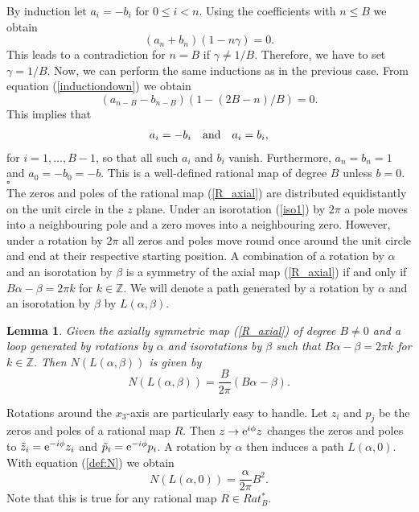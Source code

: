\documentclass[a4paper,12pt]{article}
\newtheorem {lemma}[theorem]{Lemma}
\begin{document}
By induction let $a_i = -b_i$ for $0 \leq i < n$. Using the coefficients 
with $n \leq B$ we obtain
%
\begin{equation}
(a_n + b_n)(1 - n \gamma) = 0.
\end{equation}
%
This leads to a contradiction for $n = B$ if $\gamma \neq 1/B$. Therefore, we 
have to set $\gamma = 1/B$.
%
Now, we can perform the same inductions as in the previous case. From equation 
(\ref{inductiondown}) we obtain
\begin{equation}
(a_{n-B} - b_{n-B})(1 - (2B - n)/B) = 0.
\end{equation}
%
This implies that
%
\begin{equation}
\begin{array}{c c c}
a_i = - b_i & {\rm and} & a_i = b_i,
\end{array}
\end{equation}
%
for $i = 1, \dots, B-1$, so that all such $a_i$ and $b_i$ vanish. Furthermore, 
$a_n = b_n = 1$ and $a_0 = - b_0 = - b$. This is a well-defined rational 
map of degree $B$ unless $b=0$. \hfill $\square$ \\


The zeros and poles of the rational map (\ref{R_axial}) are distributed
equidistantly on the unit circle in the $z$ plane. 
Under an isorotation (\ref{iso1}) by $2 \pi$ a pole
moves into a neighbouring pole and a zero moves into a neighbouring zero.
However, under a rotation by $2 \pi$ all zeros and poles move round 
once around the unit circle and end at their respective starting 
position. A combination of a rotation by $\alpha$ and an isorotation by 
$\beta$ is a symmetry of the axial map (\ref{R_axial}) if and only if 
\mbox{$B \alpha - \beta = 2 \pi k$} for $k \in {\mathbb Z}$.
We will denote a 
path generated by a rotation by $\alpha$ and an isorotation by $\beta$ by 
$L(\alpha, \beta)$.

\begin{lemma} 
\label{l:Naxial}
Given the axially symmetric map {\rm (\ref{R_axial})} of degree $B \neq 0$
and a loop generated by rotations by $\alpha$ and isorotations by $\beta$ 
such that \mbox{$B \alpha - \beta = 2 \pi k$} for $k \in {\mathbb Z}$. Then 
$N(L(\alpha,\beta))$ is given by 
\begin{equation}
\label{Naxial}
N(L(\alpha, \beta)) = \frac{B}{2 \pi} (B \alpha - \beta).
\end{equation}
\end{lemma}

Rotations around the $x_3$-axis are particularly easy to handle. Let 
$z_i$ and $p_j$ be the zeros and poles of a rational map $R$. Then $z \to 
{\rm e}^{i\phi} z$  changes the zeros and poles to ${\tilde z_i} = 
{\rm e}^{-i\phi}  z_i$ and  ${\tilde p}_i = {\rm e}^{-i\phi} p_i$. A 
rotation by $\alpha$ then induces a path $L(\alpha, 0)$. 
With equation (\ref{def:N}) we 
obtain 
%
\begin{equation}
N (L(\alpha, 0)) = \frac{\alpha}{2 \pi} B^2.
\end{equation}
%
Note that this is true for any rational map $R \in Rat_B^*$.
\end{document}
